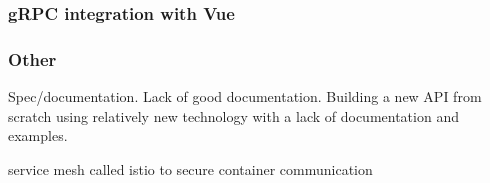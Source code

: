         \subsubsection{gRPC integration with Vue}
        

        \subsubsection{Other}
            Spec/documentation. Lack of good documentation. Building a new API from scratch using relatively new technology with a lack of documentation and examples. 

    service mesh called istio to secure container communication
    